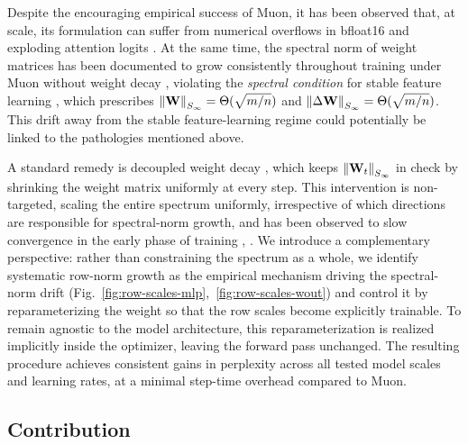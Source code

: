 \documentclass{article}
\begin{document}
Despite the encouraging empirical success of Muon, it has been observed that, at scale, its formulation can suffer from numerical overflows in bfloat16 \citep{liu_muon_2025} and exploding attention logits \citep{team_kimi_2025}. At the same time, the spectral norm of weight matrices has been documented to grow consistently throughout training under Muon without weight decay \citep[Fig.\ 9]{pethick_training_2025}, violating the \emph{spectral condition} for stable feature learning \citep{yang_spectral_2024}, which prescribes $\left \| \mathbf{W} \right\|_{S_\infty} = \Theta(\sqrt{m/n})$ and $\left \| \Delta\mathbf{W} \right\|_{S_\infty} = \Theta(\sqrt{m/n})$. This drift away from the stable feature-learning regime could potentially be linked to the pathologies mentioned above. 

A standard remedy is decoupled weight decay \citep{chen_muon_2025, chen_lion_2025, pethick_training_2025}, which keeps $\left \| \mathbf{W}_t \right\|_{S_\infty}$ in check by shrinking the weight matrix uniformly at every step. This intervention is non-targeted, scaling the entire spectrum uniformly, irrespective of which directions are responsible for spectral-norm growth, and has been observed to slow convergence in the early phase of training \cite[Fig.~2]{liu_muon_2025}, \cite[Fig.~8]{pethick_training_2025}. We introduce a complementary perspective: rather than constraining the spectrum as a whole, we identify systematic row-norm growth as the empirical mechanism driving the spectral-norm drift (Fig.~\ref{fig:row-scales-mlp},~\ref{fig:row-scales-wout}) and control it by reparameterizing the weight so that the row scales become explicitly trainable. To remain agnostic to the model architecture, this reparameterization is realized implicitly inside the optimizer, leaving the forward pass unchanged. The resulting procedure achieves consistent gains in perplexity across all tested model scales and learning rates, at a minimal step-time overhead compared to Muon.

\subsection{Contribution}
\end{document}
